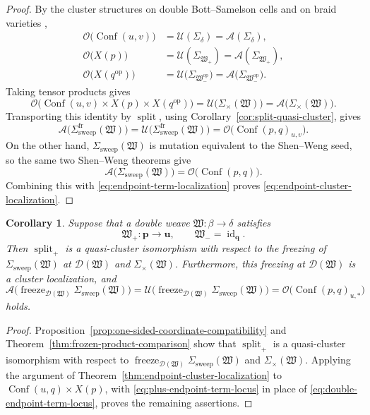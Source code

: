 \documentclass[10pt,a4paper]{article}
\newtheorem{corollary}[theorem]{Corollary}
\theoremstyle{definition}
\theoremstyle{remark}
\newcommand{\Conf}{\operatorname{Conf}}
\newcommand{\Dcal}{\mathcal D}
\newcommand{\fW}{\mathfrak W}
\newcommand{\Split}{\operatorname{split}}
\newcommand{\id}{\operatorname{id}}
\begin{document}
\begin{proof}
By the cluster structures on double Bott--Samelson cells
\cite[Theorems~3.45 and~4.13]{ShenWeng2021} and on braid varieties
\cite[Theorem~1.1]{CasalsEtAlBraidVarieties},
\[
 \begin{aligned}
 \mathcal O\bigl(\Conf(u,v)\bigr)
 &=\mathcal U(\Sigma_\delta)
  =\mathcal A(\Sigma_\delta),\\
 \mathcal O\bigl(X(p)\bigr)
 &=\mathcal U(\Sigma_{\fW_+})
  =\mathcal A(\Sigma_{\fW_+}),\\
 \mathcal O\bigl(X(q^{\mathrm{op}})\bigr)
 &=\mathcal U\bigl(\Sigma_{\fW_-^{\mathrm{op}}}\bigr)
  =\mathcal A\bigl(\Sigma_{\fW_-^{\mathrm{op}}}\bigr).
 \end{aligned}
\]
Taking tensor products gives
\[
 \mathcal O\bigl(
  \Conf(u,v)\times X(p)\times X(q^{\mathrm{op}})
 \bigr)
 =\mathcal U\bigl(\Sigma_\times(\fW)\bigr)
 =\mathcal A\bigl(\Sigma_\times(\fW)\bigr).
\]
 Transporting this identity by \(\Split\), using
 Corollary~\ref{cor:split-quasi-cluster}, gives
\[
 \mathcal A\bigl(\Sigma_{\mathrm{sweep}}^{\mathrm{fr}}(\fW)\bigr)
 =\mathcal U\bigl(\Sigma_{\mathrm{sweep}}^{\mathrm{fr}}(\fW)\bigr)
 =\mathcal O\bigl(\Conf(p,q)_{u,v}\bigr).
\]
On the other hand, \(\Sigma_{\mathrm{sweep}}(\fW)\) is mutation equivalent
to the Shen--Weng seed, so the same two Shen--Weng theorems give
\[
 \mathcal A\bigl(\Sigma_{\mathrm{sweep}}(\fW)\bigr)
 =\mathcal O\bigl(\Conf(p,q)\bigr).
\]
Combining this with \eqref{eq:endpoint-term-localization} proves
\eqref{eq:endpoint-cluster-localization}.
\end{proof}

\begin{corollary}
\label{cor:plus-endpoint-cluster-localization}
Suppose that a double weave \(\fW:\beta\longrightarrow\delta\) satisfies
\[
 \fW_+:\mathbf p\longrightarrow\mathbf u,
 \qquad
 \fW_-=\id_{\mathbf q}.
\]
Then \(\Split_+\) is a quasi-cluster isomorphism with respect to the freezing
of \(\Sigma_{\mathrm{sweep}}(\fW)\) at \(\Dcal(\fW)\) and
\(\Sigma_\times(\fW)\).  Furthermore, this freezing at \(\Dcal(\fW)\) is a
cluster localization, and
\[
 \mathcal A\bigl(
  \operatorname{freeze}_{\Dcal(\fW)}\Sigma_{\mathrm{sweep}}(\fW)
 \bigr)
 =\mathcal U\bigl(
  \operatorname{freeze}_{\Dcal(\fW)}\Sigma_{\mathrm{sweep}}(\fW)
 \bigr)
 =\mathcal O\bigl(\Conf(p,q)_{u,*}\bigr)
\]
holds.
\end{corollary}

\begin{proof}
Proposition~\ref{prop:one-sided-coordinate-compatibility} and
Theorem~\ref{thm:frozen-product-comparison} show that \(\Split_+\) is a
quasi-cluster isomorphism with respect to
\(\operatorname{freeze}_{\Dcal(\fW)}\Sigma_{\mathrm{sweep}}(\fW)\) and
\(\Sigma_\times(\fW)\). Applying the argument of
Theorem~\ref{thm:endpoint-cluster-localization} to
\(\Conf(u,q)\times X(p)\), with
\eqref{eq:plus-endpoint-term-locus} in place of
\eqref{eq:double-endpoint-term-locus}, proves the remaining assertions.
\end{proof}
\end{document}
